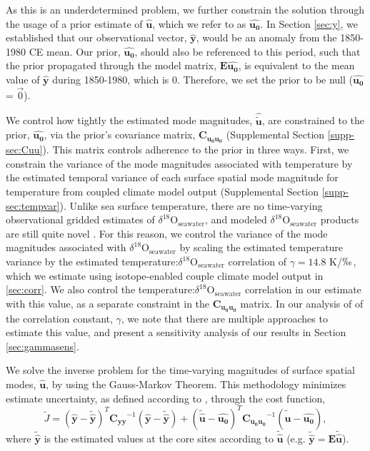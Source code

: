 \documentclass[draft]{agujournal2019}
\begin{document}
As this is an underdetermined problem, we further constrain the solution through the usage of a prior estimate of $\mathbf{\hat{u}}$, which we refer to as $\mathbf{\hat{u_{0}}}$. In Section \ref{sec:y}, we established that our observational vector, $\mathbf{\hat{y}}$, would be an anomaly from the 1850-1980 CE mean. Our prior, $\mathbf{\hat{u_{0}}}$, should also be referenced to this period, such that the prior propagated through the model matrix, $\mathbf{E\hat{u_{0}}}$, is equivalent to the mean value of $\mathbf{\hat{y}}$ during 1850-1980, which is 0. Therefore, we set the prior to be null ($\mathbf{\hat{u_0}}$ = $\vec{0}$).

We control how tightly the estimated mode magnitudes, $\mathbf{\hat{\tilde{u}}}$, are constrained to the prior, $\mathbf{\hat{u_{0}}}$, via the prior's covariance matrix, $\mathbf{C_{u_{0}u_{0}}}$ (Supplemental Section \ref{supp-sec:Cuu}). This matrix controls adherence to the prior in three ways. First, we constrain the variance of the mode magnitudes associated with temperature by the estimated temporal variance of each surface spatial mode magnitude for temperature from coupled climate model output (Supplemental Section \ref{supp-sec:tempvar}). Unlike sea surface temperature, there are no time-varying observational gridded estimates of $\delta^{18}\mathrm{O}_{\mathrm{seawater}}$, and modeled $\delta^{18}\mathrm{O}_{\mathrm{seawater}}$ products are still quite novel \cite[]{Brady-Stevenson-2019:Connected}. For this reason, we control the variance of the mode magnitudes associated with $\delta^{18}\mathrm{O}_{\mathrm{seawater}}$ by scaling the estimated temperature variance by the estimated temperature:$\delta^{18}\mathrm{O}_{\mathrm{seawater}}$ correlation of $\gamma = 14.8$ K/$\permil$, which we estimate using isotope-enabled couple climate model output in \ref{sec:corr}. We also control the temperature:$\delta^{18}\mathrm{O}_{\mathrm{seawater}}$ correlation in our estimate with this value, as a separate constraint in the $\mathbf{C_{u_{0}u_{0}}}$ matrix. In our analysis of of the correlation constant, $\gamma$, we note that there are multiple approaches to estimate this value, and present a sensitivity analysis of our results in Section \ref{sec:gammasens}.

We solve the inverse problem for the time-varying magnitudes of surface spatial modes, $\mathbf{\hat{u}}$, by using the Gauss-Markov Theorem. This methodology minimizes estimate uncertainty, as defined according to , through the cost function, 
\begin{equation}  
\label{eq:costfunc}
\tilde{J} = \left(\mathbf{\hat{y}}-\mathbf{\tilde{\hat{y}}}\right)^T\mathbf{C_{yy}}^{-1}\left(\mathbf{\hat{y}}-\mathbf{\tilde{\hat{y}}}\right)+(\mathbf{\tilde{\hat{u}} - \hat{u_0}})^T\mathbf{C_{u_{0}u_{0}}}^{-1}(\mathbf{\tilde{\hat{u}} - \hat{u_0}}), 
\end{equation}
where $\mathbf{\tilde{\hat{y}}}$ is the estimated values at the core sites according to $\mathbf{\tilde{\hat{u}}}$ (e.g. $\mathbf{\tilde{\hat{y}}} = \mathbf{E\tilde{\hat{u}}}$).
\end{document}
